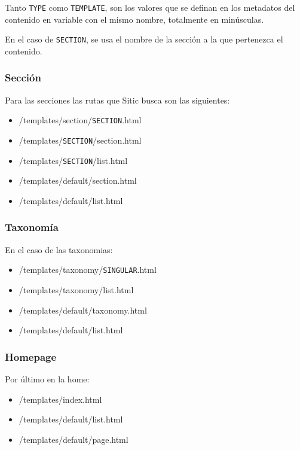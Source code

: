 Tanto \texttt{TYPE} como \texttt{TEMPLATE}, son los valores que se definan en los metadatos del contenido
en variable con el mismo nombre, totalmente en minúsculas.

En el caso de \texttt{SECTION}, se usa el nombre de la sección a la que pertenezca el contenido.

\subsubsection{Sección}

Para las secciones las rutas que Sitic busca son las siguientes:

\begin{itemize}
    \item /templates/section/\texttt{SECTION}.html
    \item /templates/\texttt{SECTION}/section.html
    \item /templates/\texttt{SECTION}/list.html
    \item /templates/default/section.html
    \item /templates/default/list.html
\end{itemize}

\subsubsection{Taxonomía}

En el caso de las taxonomias:

\begin{itemize}
    \item /templates/taxonomy/\texttt{SINGULAR}.html
    \item /templates/taxonomy/list.html
    \item /templates/default/taxonomy.html
    \item /templates/default/list.html
\end{itemize}

\subsubsection{Homepage}

Por último en la home:

\begin{itemize}
    \item /templates/index.html
    \item /templates/default/list.html
    \item /templates/default/page.html
\end{itemize}

